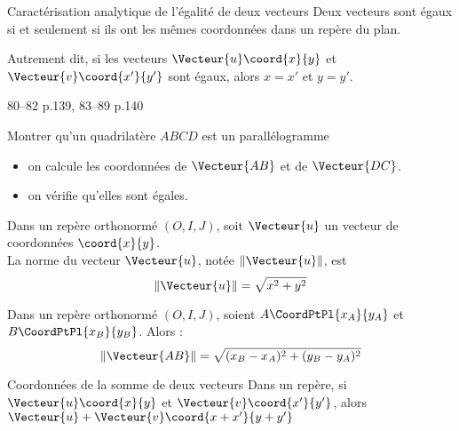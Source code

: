 \documentclass[a4paper]{article}
\begin{document}
\begin{propriete}{Caractérisation analytique de l'égalité de deux vecteurs}{}
  Deux vecteurs sont égaux si et seulement si ils ont les mêmes coordonnées dans un repère du plan.

  Autrement dit, si les vecteurs $\Vecteur{u}\coord{x}{y}$ et $\Vecteur{v}\coord{x'}{y'}$ sont égaux, alors 
  $x=x'$ et $y=y'$.
\end{propriete}

\begin{exercices}{}{}
  80--82 p.139, 83--89 p.140
\end{exercices}

\begin{methode}{Montrer qu'un quadrilatère $ABCD$ est un parallélogramme}{}
  \begin{itemize}
    \item on calcule les coordonnées de $\Vecteur{AB}$ et de $\Vecteur{DC}$.
    \item on vérifie qu'elles sont égales. 
  \end{itemize}



\end{methode}


\begin{definition}{}{}
  Dans un repère orthonormé $(O,I,J)$, soit $\Vecteur{u}$ un vecteur de coordonnées $\coord{x}{y}$.\\
  La norme du vecteur $\Vecteur{u}$, notée $ \left\lVert \Vecteur{u} \right\rVert$, est 
  $$ \left\lVert \Vecteur{u} \right\rVert = \sqrt{x^2+y^2} $$ 
\end{definition}

\begin{definition}{}{}
  Dans un repère orthonormé $(O,I,J)$, soient $A\CoordPtPl{x_A}{y_A}$ et $B\CoordPtPl{x_B}{y_B}$. Alors :
  $$ \left\lVert \Vecteur{AB} \right\rVert = \sqrt{(x_B-x_A)^2+(y_B-y_A)^2} $$ 
\end{definition}


\begin{propriete}{Coordonnées de la somme de deux vecteurs}{}
  Dans un repère, si $\Vecteur{u}\coord{x}{y}$  et $\Vecteur{v}\coord{x'}{y'}$, alors $\Vecteur{u}+\Vecteur{v}\coord{x+x'}{y+y'}$
\end{propriete}
\end{document}
